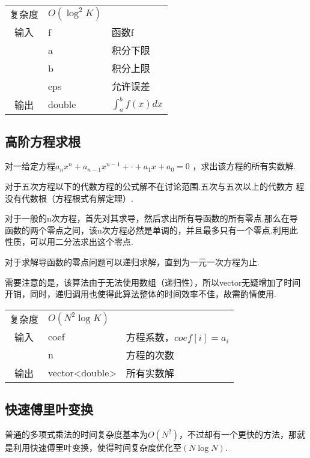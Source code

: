 \begin{longtable}{|c|l|l|}
复杂度 & $O({\log}^{2} K)$ &  \\
输入 & f & 函数f \\
 & a & 积分下限 \\
 & b & 积分上限 \\
 & eps & 允许误差 \\ 
输出 & double & $\int_{a} ^{b} f(x)  dx$ \\ 
\end{longtable}



    \subsection{高阶方程求根}\small
对一给定方程$a_{n}x^{n} + a_{n-1}x^{n-1} + \cdot + a_{1}x + a_{0} = 0$
，求出该方程的所有实数解.

对于五次方程以下的代数方程的公式解不在讨论范围.五次与五次以上的代数方
程没有代数根（方程根式有解定理）.

对于一般的n次方程，首先对其求导，然后求出所有导函数的所有零点.那么在导
函数的两个零点之间，该n次方程必然是单调的，并且最多只有一个零点.利用此
性质，可以用二分法求出这个零点.

对于求解导函数的零点问题可以递归求解，直到为一元一次方程为止.

需要注意的是，该算法由于无法使用数组（递归性），所以vector无疑增加了时间
开销，同时，递归调用也使得此算法整体的时间效率不佳，故需酌情使用.

\begin{longtable}{|c|l|l|}
复杂度 & $O(N^{2}\log K)$ &  \\
输入 & coef & 方程系数，$coef[i] = a_{i}$ \\
 & n & 方程的次数 \\
输出 & vector<double> & 所有实数解 \\ 
\end{longtable}



    \subsection{快速傅里叶变换}\small
普通的多项式乘法的时间复杂度基本为$O(N^2)$，不过却有一个更快的方法，那就
是利用快速傅里叶变换，使得时间复杂度优化至$(N\log N)$.

